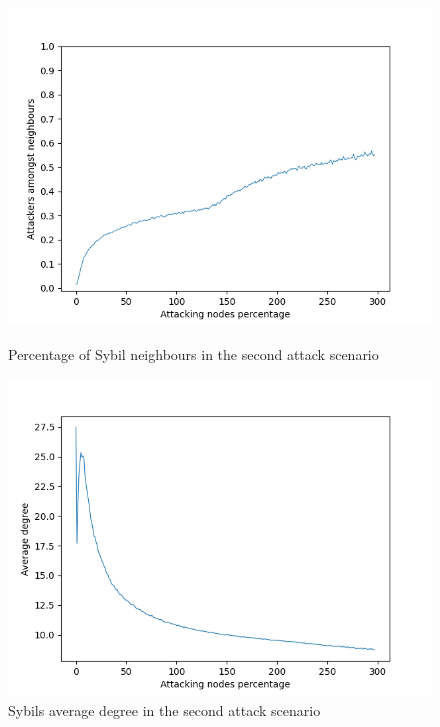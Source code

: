     \begin{figure}[ht]
        \begin{minipage}[b]{0.5\linewidth}
            \includegraphics[width=1.1\textwidth]{pict/results/ext-hon-atk-neigh.png}
			\centering
			\caption{Percentage of Sybil neighbours in the second attack scenario}
			\label{fig:ex-atk-neigh}
        \end{minipage}
        \hspace{0.5cm}
        \begin{minipage}[b]{0.5\linewidth}
			\centering
            \includegraphics[width=1.1\textwidth]{pict/results/ex-atk-avg-degree.png}
			\caption{Sybils average degree in the second attack scenario}
			\label{fig:ex-atk-degree}
        \end{minipage}
    \end{figure}

